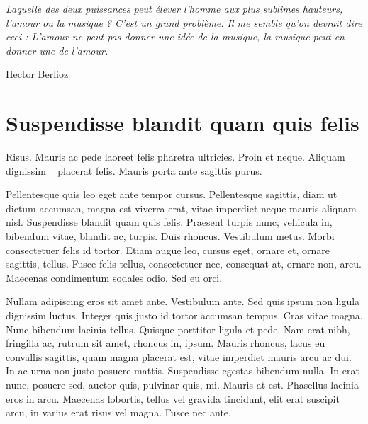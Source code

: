 \documentclass[../hdr.tex]{subfiles}
\begin{document}
\label{chap:titre}

\epigraph{\itshape 
  Laquelle des deux puissances peut élever l'homme aux plus sublimes hauteurs,
  l'amour ou la musique ? C'est un grand problème. Il me semble qu'on devrait
  dire ceci : L'amour ne peut pas donner une idée de la musique, la musique peut
  en donner une de l'amour.
}{Hector Berlioz\footnotemark[1]}
\addtocounter{footnote}{1}

\section{Suspendisse blandit quam quis felis}

Risus. Mauris ac pede laoreet felis pharetra ultricies. Proin et neque. Aliquam
dignissim \footnotemark~\cite{serra2013roadmap} placerat felis. Mauris porta ante sagittis purus.

Pellentesque quis leo eget ante tempor cursus. Pellentesque sagittis, diam ut
dictum accumsan, magna est viverra erat, vitae imperdiet neque mauris aliquam
nisl. Suspendisse blandit quam quis felis. Praesent turpis nunc, vehicula in,
bibendum vitae, blandit ac, turpis. Duis rhoncus. Vestibulum metus. Morbi
consectetuer felis id tortor. Etiam augue leo, cursus eget, ornare et, ornare
sagittis, tellus. Fusce felis tellus, consectetuer nec, consequat at, ornare
non, arcu. Maecenas condimentum sodales odio. Sed eu orci.


Nullam adipiscing eros sit amet ante. Vestibulum ante. Sed quis ipsum non ligula
dignissim luctus. Integer quis justo id tortor accumsan tempus. Cras vitae
magna. Nunc bibendum lacinia tellus. Quisque porttitor ligula et pede. Nam erat
nibh, fringilla ac, rutrum sit amet, rhoncus in, ipsum. Mauris rhoncus, lacus eu
convallis sagittis, quam magna placerat est, vitae imperdiet mauris arcu ac dui.
In ac urna non justo posuere mattis. Suspendisse egestas bibendum nulla. In erat
nunc, posuere sed, auctor quis, pulvinar quis, mi. Mauris at est. Phasellus
lacinia eros in arcu. Maecenas lobortis, tellus vel gravida tincidunt, elit erat
suscipit arcu, in varius erat risus vel magna. Fusce nec ante.
\end{document}
